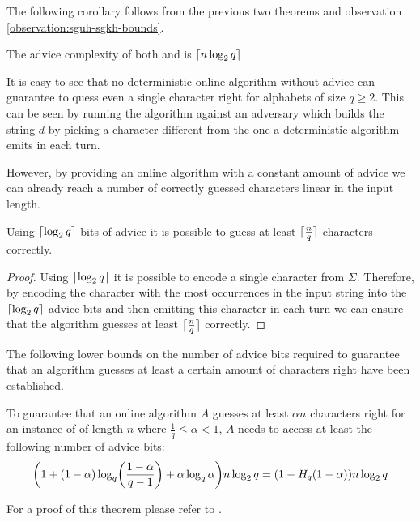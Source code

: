 The following corollary follows from the previous two theorems and
observation \ref{observation:sguh-sgkh-bounds}.

\begin{corollary}
    The advice complexity of both  and  is $\lceil n \log_2
    q\rceil$.
\end{corollary}

It is easy to see that no deterministic online algorithm without advice
can guarantee to quess even a single character right for alphabets of size
$q \geq 2$. This can be seen by running the algorithm against an adversary
which builds the string $d$ by picking a character different from the one
a deterministic algorithm emits in each turn.

However, by providing an online algorithm with a constant amount of advice
we can already reach a number of correctly guessed characters linear in
the input length.

\begin{theorem}
    Using $\lceil\log_2 q\rceil$ bits of advice it is possible to guess at least
    $\lceil\frac{n}{q}\rceil$ characters correctly.
\end{theorem}

\begin{proof}
    Using $\lceil\log_2 q\rceil$ it is possible to encode a single character from
    $\Sigma$. Therefore, by encoding the character with the most
    occurrences in the input string into the $\lceil\log_2 q\rceil$ advice bits
    and then emitting this character in each turn we can ensure that the
    algorithm guesses at least $\lceil\frac{n}{q}\rceil$ correctly.
\end{proof}

The following lower bounds on the number of advice bits required to
guarantee that an algorithm guesses at least a certain amount of
characters right have been established.

\begin{theorem}\label{theorem:sguh-lower-ratio}\label{theorem:sgkh-lower-ratio}
    To guarantee that an online algorithm $A$ guesses at least $\alpha{}n$
    characters right for an instance of  of length $n$ where
    $\frac{1}{q} \leq \alpha < 1$, $A$ needs to access at least the
    following number of advice bits:
    $$
        \paren*{1 + (1 - \alpha)\log_q\paren*{\frac{1 - \alpha}{q - 1}} +
        \alpha\log_q\alpha} n\lg{}q
        =
        (1 - H_q (1 - \alpha)) n\lg{}q
    $$
\end{theorem}

For a proof of this theorem please refer to \cite{string-guessing}.

